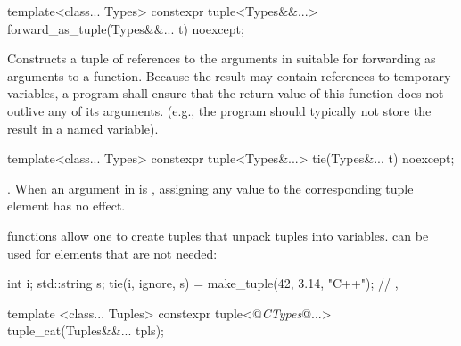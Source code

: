 %
%
\begin{itemdecl}
template<class... Types>
  constexpr tuple<Types&&...> forward_as_tuple(Types&&... t) noexcept;
\end{itemdecl}

\begin{itemdescr}
\pnum
\effects Constructs a tuple of references to the arguments in  suitable
for forwarding as arguments to a function. Because the result may contain references
to temporary variables, a program shall ensure that the return value of this
function does not outlive any of its arguments. (e.g., the program should typically
not store the result in a named variable).

\pnum
\returns {}
\end{itemdescr}

%
%
%
\begin{itemdecl}
template<class... Types>
  constexpr tuple<Types&...> tie(Types&... t) noexcept;
\end{itemdecl}

\begin{itemdescr}
\pnum
\returns  {}.  When an
argument in  is , assigning
any value to the corresponding tuple element has no effect.

\pnum
\enterexample
{} functions allow one to create tuples that unpack
tuples into variables.  can be used for elements that
are not needed:
\begin{codeblock}
int i; std::string s;
tie(i, ignore, s) = make_tuple(42, 3.14, "C++");
// , 
\end{codeblock}
\exitexample
\end{itemdescr}

\begin{itemdecl}
template <class... Tuples>
  constexpr tuple<@\textit{CTypes}@...> tuple_cat(Tuples&&... tpls);
\end{itemdecl}

